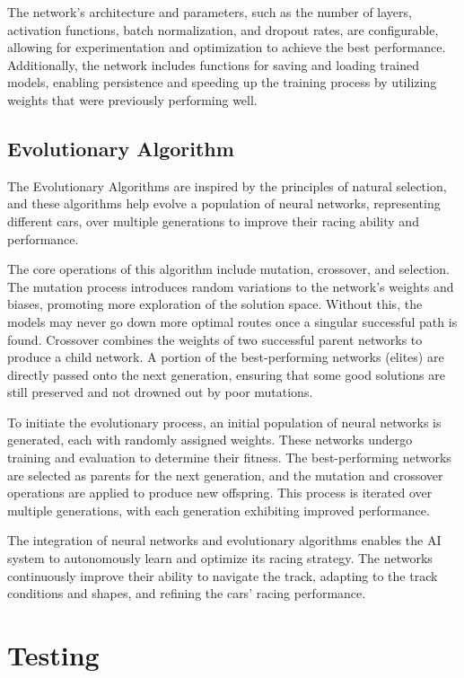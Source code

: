 \documentclass[12pt]{article}
\begin{document}
The network's architecture and parameters, such as the number of layers, 
activation functions, batch normalization, and dropout rates, are configurable, 
allowing for experimentation and optimization to achieve the best performance. 
Additionally, the network includes functions for saving and loading trained 
models, enabling persistence and speeding up the training process by utilizing 
weights that were previously performing well.

\subsection{Evolutionary Algorithm}

The Evolutionary Algorithms are inspired by the principles of natural 
selection, and these algorithms help evolve a population of neural networks, 
representing different cars, over multiple generations to improve their racing 
ability and performance.

The core operations of this algorithm include mutation, crossover, and 
selection. The mutation process introduces random variations to the network's 
weights and biases, promoting more exploration of the solution space. Without 
this, the models may never go down more optimal routes once a singular 
successful path is found. Crossover combines the weights of two successful 
parent networks to produce a child network. A portion of the best-performing 
networks (elites) are directly passed onto the next generation, ensuring that 
some good solutions are still preserved and not drowned out by poor mutations.

To initiate the evolutionary process, an initial population of neural networks 
is generated, each with randomly assigned weights. These networks undergo 
training and evaluation to determine their fitness. The best-performing 
networks are selected as parents for the next generation, and the mutation and 
crossover operations are applied to produce new offspring. This process is 
iterated over multiple generations, with each generation exhibiting improved 
performance.

The integration of neural networks and evolutionary algorithms enables the AI 
system to autonomously learn and optimize its racing strategy. The networks 
continuously improve their ability to navigate the track, adapting to the track 
conditions and shapes, and refining the cars' racing performance.

\section{Testing}
\end{document}
